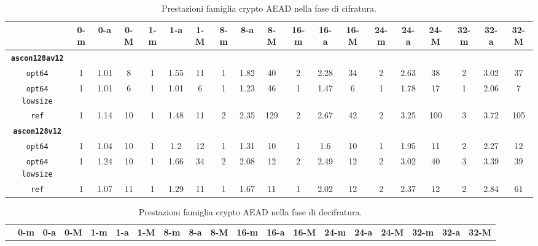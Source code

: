 \begin{landscape}
    \begin{table}[]
        \caption{Prestazioni famiglia crypto AEAD nella fase di cifratura.}
        \begin{adjustbox}{width=600pt}
            \centering
			\begin{tabular}{|c|c|c|c|c|c|c|c|c|c|c|c|c|c|c|c|c|c|c|}
				\hline
				& \textbf{0-m} & \textbf{0-a} & \textbf{0-M} & \textbf{1-m} & \textbf{1-a} & \textbf{1-M} & \textbf{8-m} & \textbf{8-a} & \textbf{8-M} & \textbf{16-m} & \textbf{16-a} & \textbf{16-M} & \textbf{24-m} & \textbf{24-a} & \textbf{24-M} & \textbf{32-m} & \textbf{32-a} & \textbf{32-M} \\
				\hline
				\texttt{\textbf{ascon128av12}} & & & & & & & & & & & & & & & & & & \\
				\hline
				\texttt{opt64} & 1 & 1.01 & 8 & 1 & 1.55 & 11 & 1 & 1.82 & 40 & 2 & 2.28 & 34 & 2 & 2.63 & 38 & 2 & 3.02 & 37 \\
				\hline
				\texttt{opt64 lowsize} & 1 & 1.01 & 6 & 1 & 1.01 & 6 & 1 & 1.23 & 46 & 1 & 1.47 & 6 & 1 & 1.78 & 17 & 1 & 2.06 & 7 \\
				\hline
				\texttt{ref} & 1 & 1.14 & 10 & 1 & 1.48 & 11 & 2 & 2.35 & 129 & 2 & 2.67 & 42 & 2 & 3.25 & 100 & 3 & 3.72 & 105 \\
				\hline
				\texttt{\textbf{ascon128v12}} & & & & & & & & & & & & & & & & & & \\
				\hline
				\texttt{opt64} & 1 & 1.04 & 10 & 1 & 1.2 & 12 & 1 & 1.31 & 10 & 1 & 1.6 & 10 & 1 & 1.95 & 11 & 2 & 2.27 & 12 \\
				\hline
				\texttt{opt64 lowsize} & 1 & 1.24 & 10 & 1 & 1.66 & 34 & 2 & 2.08 & 12 & 2 & 2.49 & 12 & 2 & 3.02 & 40 & 3 & 3.39 & 39 \\
				\hline
				\texttt{ref} & 1 & 1.07 & 11 & 1 & 1.29 & 11 & 1 & 1.67 & 11 & 1 & 2.02 & 12 & 2 & 2.37 & 12 & 2 & 2.84 & 61 \\
				\hline
			\end{tabular}
		\end{adjustbox}
	\end{table}
    \begin{table}[]
        \caption{Prestazioni famiglia crypto AEAD nella fase di decifratura.}
        \begin{adjustbox}{width=600pt}
            \centering
			\begin{tabular}{|c|c|c|c|c|c|c|c|c|c|c|c|c|c|c|c|c|c|c|}
				\hline
				& \textbf{0-m} & \textbf{0-a} & \textbf{0-M} & \textbf{1-m} & \textbf{1-a} & \textbf{1-M} & \textbf{8-m} & \textbf{8-a} & \textbf{8-M} & \textbf{16-m} & \textbf{16-a} & \textbf{16-M} & \textbf{24-m} & \textbf{24-a} & \textbf{24-M} & \textbf{32-m} & \textbf{32-a} & \textbf{32-M} \\

\end{tabular}
\end{adjustbox}
\end{table}
\end{landscape}
